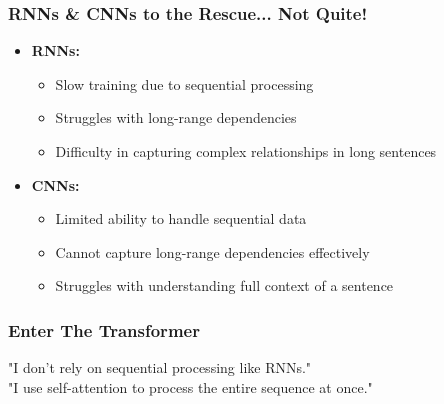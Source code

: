 \documentclass{beamer}
\begin{document}
\begin{frame}
    \frametitle{RNNs \& CNNs to the Rescue... Not Quite!}
    \begin{itemize}
        \item \textbf{RNNs:}
            \begin{itemize}
                \item Slow training due to sequential processing
                \item Struggles with long-range dependencies
                \item Difficulty in capturing complex relationships in long sentences
            \end{itemize}
        \item \textbf{CNNs:}
            \begin{itemize}
                \item Limited ability to handle sequential data
                \item Cannot capture long-range dependencies effectively
                \item Struggles with understanding full context of a sentence
            \end{itemize}
    \end{itemize}
\end{frame}



\begin{frame}
    \frametitle{Enter The Transformer}
    \begin{center}
    \end{center}
    \begin{center}
       
        \large"I don’t rely on sequential processing like RNNs." \\[0.5cm]
        \pause
        \large"I use self-attention to process the entire sequence at once." \\
    \end{center}
\end{frame}
\end{document}
